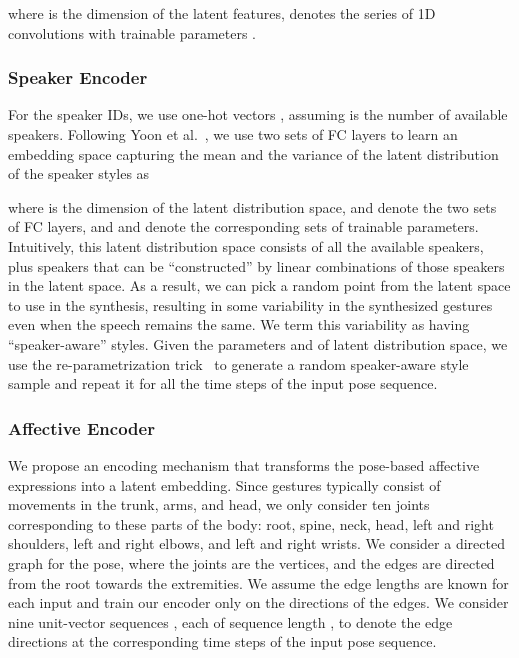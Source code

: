 \documentclass[conference,compsoc]{IEEEtran}
\theoremstyle{definition}
\begin{document}
where  is the dimension of the latent features,  denotes the series of 1D convolutions with trainable parameters .

\subsubsection{Speaker Encoder}\label{subsubsec:speaker_encoder}
For the speaker IDs, we use one-hot vectors , assuming  is the number of available speakers. Following Yoon et al.~\cite{trimodal}, we use two sets of FC layers to learn an embedding space capturing the mean  and the variance  of the latent distribution of the speaker styles as

where  is the dimension of the latent distribution space,  and  denote the two sets of FC layers, and  and  denote the corresponding sets of trainable parameters. Intuitively, this latent distribution space consists of all the available speakers, plus speakers that can be ``constructed'' by linear combinations of those speakers in the latent space. As a result, we can pick a random point from the latent space to use in the synthesis, resulting in some variability in the synthesized gestures even when the speech remains the same. We term this variability as having ``speaker-aware'' styles. Given the parameters  and  of latent distribution space, we use the re-parametrization trick~\cite{vae} to generate a random speaker-aware style sample  and repeat it for all the  time steps of the input pose sequence. 

\subsubsection{Affective Encoder}\label{subsubsec:aff_encoder}
We propose an encoding mechanism that transforms the pose-based affective expressions into a latent embedding. Since gestures typically consist of movements in the trunk, arms, and head, we only consider ten joints corresponding to these parts of the body: root, spine, neck, head, left and right shoulders, left and right elbows, and left and right wrists. We consider a directed graph for the pose, where the joints are the vertices, and the edges are directed from the root towards the extremities.
We assume the edge lengths are known for each input and train our encoder only on the directions of the edges. We consider nine unit-vector sequences , each of sequence length , to denote the edge directions at the corresponding  time steps of the input pose sequence.
\end{document}
